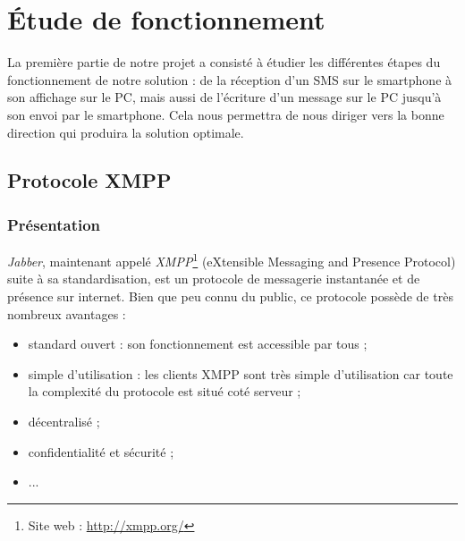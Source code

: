 \cleardoublepage



\chapter{Étude de fonctionnement}

La première partie de notre projet a consisté à étudier les différentes étapes du fonctionnement de notre solution : de la réception d'un SMS sur le smartphone à son affichage sur le PC, mais aussi de l'écriture d'un message sur le PC jusqu'à son envoi par le smartphone.
Cela nous permettra de nous diriger vers la bonne direction qui produira la solution optimale.
\\






\section{Protocole XMPP}


\subsection{Présentation}

\textit{Jabber}, maintenant appelé \textit{XMPP}\footnote{Site web : \href{http://xmpp.org/}{http://xmpp.org/}} (eXtensible Messaging and Presence Protocol) suite à sa standardisation, est un protocole de messagerie instantanée et de présence sur internet.
Bien que peu connu du public, ce protocole possède de très nombreux avantages :
\begin{itemize}
	\item standard ouvert : son fonctionnement est accessible par tous ;
	\item simple d'utilisation : les clients XMPP sont très simple d'utilisation car toute la complexité du protocole est situé coté serveur ;
	\item décentralisé ;
	\item confidentialité et sécurité ;
	\item ...
\\
\end{itemize}

